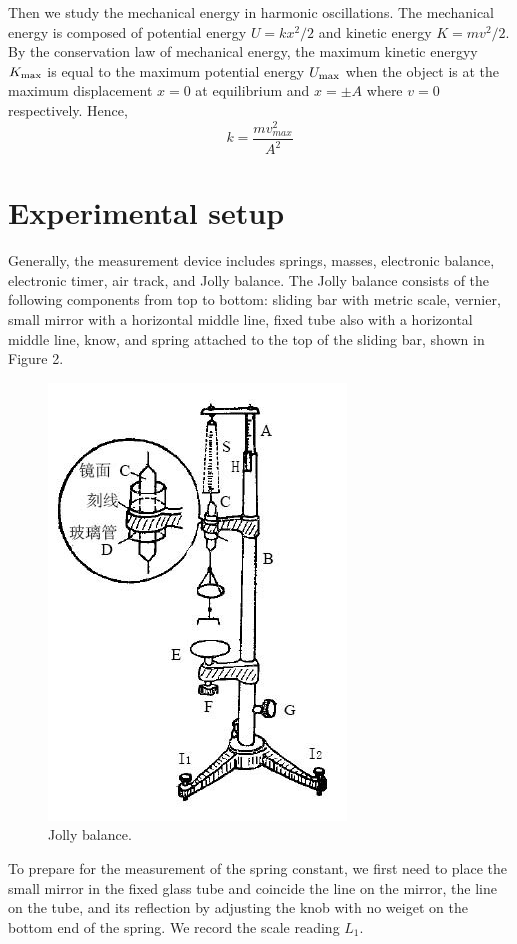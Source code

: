 \documentclass[a4paper]{report}
\begin{document}
	Then we study the mechanical energy in harmonic oscillations. The mechanical energy is composed of potential energy $U=kx^2/2$ and kinetic energy $K=mv^2/2$. By the conservation law of mechanical energy, the maximum kinetic energyy $K_{\rm{max}}$ is equal to the maximum potential energy $U_{\rm{max}}$ when the object is at the maximum displacement $x=0$ at equilibrium and $x=\pm A$ where $v=0$ respectively. Hence,
	\begin{equation}
	k=\dfrac{mv_{max}^2}{A^2}
	\end{equation}
	\section{Experimental setup}
	Generally, the measurement device includes springs, masses, electronic balance, electronic timer, air track, and Jolly balance. The Jolly balance consists of the following components from top to bottom: sliding bar with metric scale, vernier, small mirror with a horizontal middle line, fixed tube also with a horizontal middle line, know, and spring attached to the top of the sliding bar, shown in Figure 2.
	\begin{figure}[H]
		\centering
		\includegraphics[width=0.5\linewidth]{2.jpg}
		\caption{Jolly balance.}
	\end{figure}
	To prepare for the measurement of the spring constant, we first need to place the small mirror in the fixed glass tube and coincide the line on the mirror, the line on the tube, and its reflection by adjusting the knob with no weiget on the bottom end of the spring. We record the scale reading $L_1$.
	
\end{document}
